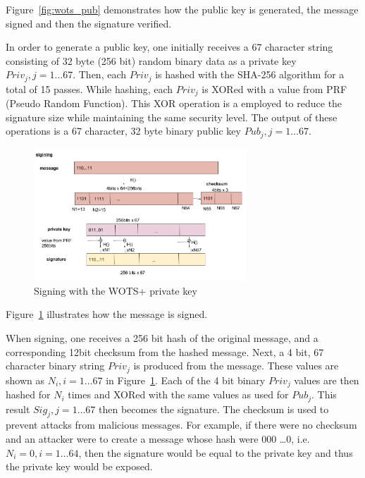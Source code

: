 \documentclass[a4paper,10pt,twocolumn]{article}
\begin{document}
 Figure~\ref{fig:wots_pub} demonstrates how the public key is generated, the message signed and then the signature verified.

 In order to generate a public key, one initially receives a 67 character string consisting of 32 byte (256 bit) random binary data as a 
 private key \( Priv_{j}, j=1 \ldots 67\). Then, each \( Priv_{j} \) is hashed with the SHA-256 algorithm for a total of 15 passes. 
 While hashing, each \( Priv_{j} \) is XORed with a value from PRF (Pseudo Random Function). This XOR operation is a employed to reduce 
 the signature size while maintaining the same security level. The output of these operations is a 67 character, 32 byte binary public 
 key \( Pub_{j}, j=1 \ldots 67\).

 \begin{figure}[ht]
	\begin{center}
	\includegraphics[width=80mm]{wots_sign.png}
	  \caption{Signing with the WOTS+ private key}
    \label{fig:wots_sign}
	\end{center}
 \end{figure}

 Figure~\ref{fig:wots_sign} illustrates how the message is signed.

 When signing, one receives a 256 bit hash of the original message, and a corresponding 12bit checksum from the hashed message.
 Next, a 4 bit, 67 character binary string \( Priv_j \) is produced from the message. These values are shown as \(N_i,i=1 \ldots 67\) in 
 Figure~\ref{fig:wots_sign}. Each of the 4 bit binary \( Priv_j \) values are then hashed for \(N_i\) times and XORed with the same 
 values as used for \( Pub_{j} \). This result \( Sig_j, j=1 \ldots 67 \) then becomes the signature. The checksum is used to prevent 
 attacks from malicious messages. For example, if there were no checksum and an attacker were to create a message whose hash were 000 
 \ldots 0, i.e. \( N_i = 0, i=1 \ldots 64 \), then the signature would be equal to the private key and thus the private key would be 
 exposed.
\end{document}
